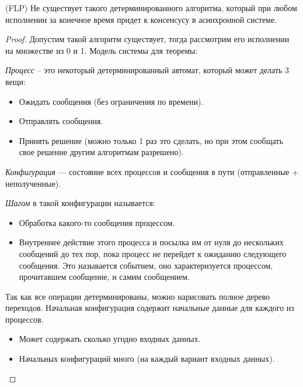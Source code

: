  
\begin{theorem}(FLP)
    Не существует такого детерминированного алгоритма, который при любом исполнении 
    за конечное время придет к консенсусу в асинхронной системе.
\end{theorem}
\begin{proof}
    Допустим такой алгоритм существует, тогда рассмотрим его исполнении на множестве из 0 и 1.
    Модель системы для теоремы:
    \begin{definition}
        \textit{Процесс} -- это некоторый детерминированный автомат, который может делать 3 вещи:
        \begin{itemize}
            \item Ожидать сообщения (без ограничения по времени).
            \item Отправлять сообщения.
            \item Принять решение (можно только 1 раз это сделать, но при этом 
                сообщать свое решение другим алгоритмам разрешено).
        \end{itemize}
    \end{definition}
    \begin{definition}
        \textit{Конфигурация} --- состояние всех процессов и сообщения в пути (отправленные + неполученные).
    \end{definition}
    \begin{definition}
        \textit{Шагом} в такой конфигурации называется:
        \begin{itemize}
            \item Обработка какого-то сообщения процессом.
            \item Внутреннее действие этого процесса и посылка им от нуля до
                нескольких сообщений до тех пор, пока процесс не перейдет к 
                ожиданию следующего сообщения. Это называется событием, оно
                характеризуется процессом, прочитавшем сообщение, и самим сообщением.
        \end{itemize}
    \end{definition}
    Так как все операции детерминированы, можно нарисовать полное дерево переходов.
    Начальная конфигурация содержит начальные данные для каждого из процессов.
    \begin{itemize}
        \item Может содержать сколько угодно входных данных.
        \item Начальных конфигураций много (на каждый вариант входных данных).

\end{itemize}
\end{proof}
